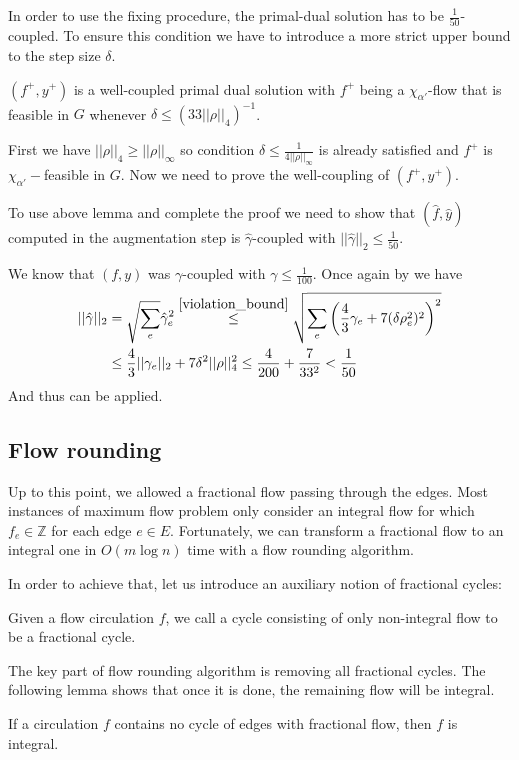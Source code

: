 In order to use the fixing procedure, the primal-dual solution has to be $\frac{1}{50}$-coupled. To ensure this condition we have to introduce a more strict upper bound to the step size $\delta$.
\begin{lemma} \label{step_upperbound}
$(f^+,y^+)$ is a well-coupled primal dual solution with $f^+$ being a $\chi_{\alpha'}$-flow that is feasible in $G$ whenever $\delta \le (33||\rho||_4)^{-1}$.
\end{lemma}
First we have $||\rho||_4 \ge ||\rho||_\infty$ so condition $\delta \le \frac{1}{4||\rho||_\infty}$ is already satisfied and $f^+$ is $\chi_{\alpha'}-$feasible in $G$.
Now we need to prove the well-coupling of $(f^+,y^+)$.

To use above lemma and complete the proof we need to show that $(\hat f,\hat y)$ computed in the augmentation step is $\hat{\gamma}$-coupled with $||\hat{\gamma}||_2 \le \frac{1}{50}$.

We know that $(f,y)$ was $\gamma$-coupled with $\gamma \le \frac{1}{100}$. Once again by  we have
\begin{equation}
\begin{split}
||\hat{\gamma}||_2
&= \sqrt{\sum_e}\hat{\gamma}_e^2
\stackrel{\ref{violation_bound}}{\le} \sqrt{\sum_e\left(\frac{4}{3}\gamma_e+7(\delta\rho_e^2)^2\right)^2} \\
&\le \frac{4}{3}||\gamma_e||_2+7\delta^2||\rho||_4^2
\le \frac{4}{200}+\frac{7}{33^2} < \frac{1}{50}
\end{split}
\end{equation}
And thus  can be applied.

\subsection{Flow rounding}
Up to this point, we allowed a fractional flow passing through the edges. Most instances of maximum flow problem only consider an integral flow for which $f_e\in\mathbb{Z}$ for each edge $e\in E$. Fortunately, we can transform a fractional flow to an integral one in $O(m\log n)$ time with a flow rounding algorithm.

In order to achieve that, let us introduce an auxiliary notion of fractional cycles:
\begin{definition}
Given a flow circulation $f$, we call a cycle consisting of only non-integral flow to be a fractional cycle.
\end{definition}
The key part of flow rounding algorithm is removing all fractional cycles. The following lemma shows that once it is done, the remaining flow will be integral.
\begin{lemma}
If a circulation $f$ contains no cycle of edges with fractional flow, then $f$ is integral.
\end{lemma}

